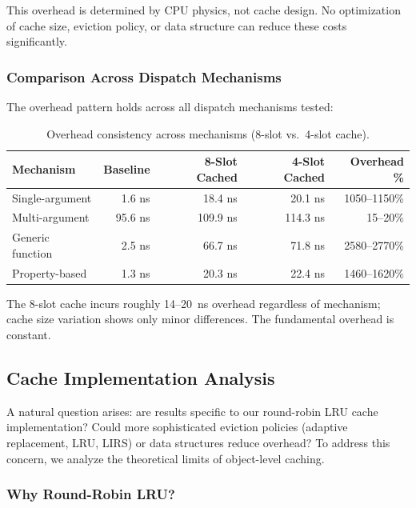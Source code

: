 \documentclass[sigplan,final]{acmart}
\begin{document}
This overhead is determined by CPU physics, not cache design. No optimization of cache size,
eviction policy, or data structure can reduce these costs significantly.

\subsubsection{Comparison Across Dispatch Mechanisms}

The overhead pattern holds across all dispatch mechanisms tested:

\begin{table}[h]
\centering
\caption{Overhead consistency across mechanisms (8-slot vs.~4-slot cache).}
\label{tab:mech-overhead}
\begin{tabular}{@{}lrrrr@{}}
\toprule
\textbf{Mechanism} & \textbf{Baseline} & \textbf{8-Slot Cached} & \textbf{4-Slot Cached} & \textbf{Overhead \%} \\
\midrule
Single-argument & 1.6 ns & 18.4 ns & 20.1 ns & 1050--1150\% \\
Multi-argument & 95.6 ns & 109.9 ns & 114.3 ns & 15--20\% \\
Generic function & 2.5 ns & 66.7 ns & 71.8 ns & 2580--2770\% \\
Property-based & 1.3 ns & 20.3 ns & 22.4 ns & 1460--1620\% \\
\bottomrule
\end{tabular}
\end{table}

The 8-slot cache incurs roughly 14--20~ns overhead regardless of mechanism; cache size variation
shows only minor differences. The fundamental overhead is constant.

\subsection{Cache Implementation Analysis}
\label{sec:cache-implementation}

A natural question arises: are results specific to our round-robin LRU cache implementation?
Could more sophisticated eviction policies (adaptive replacement, LRU, LIRS) or data structures
reduce overhead? To address this concern, we analyze the theoretical limits of object-level caching.

\subsubsection{Why Round-Robin LRU?}
\end{document}
